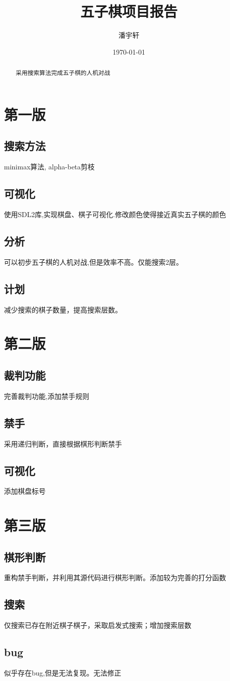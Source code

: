 \documentclass[a4paper,12pt]{ctexart}
\title{五子棋项目报告}
\author{潘宇轩}
\date{\today}
\begin{document}
\maketitle

\begin{abstract}
    采用搜索算法完成五子棋的人机对战
\end{abstract}

\tableofcontents
\section{第一版}

\subsection{搜索方法}

minimax算法, alpha-beta剪枝

\subsection{可视化}
使用SDL2库,实现棋盘、棋子可视化.修改颜色使得接近真实五子棋的颜色

\subsection{分析}
可以初步五子棋的人机对战,但是效率不高。仅能搜索2层。

\subsection{计划}
减少搜索的棋子数量，提高搜索层数。

\section{第二版}

\subsection{裁判功能}
完善裁判功能,添加禁手规则

\subsection{禁手}
采用递归判断，直接根据棋形判断禁手

\subsection{可视化}
添加棋盘标号

\section{第三版}

\subsection{棋形判断}
重构禁手判断，并利用其源代码进行棋形判断。添加较为完善的打分函数

\subsection{搜索}
仅搜索已存在附近棋子棋子，采取启发式搜索；增加搜索层数

\subsection{bug}
似乎存在bug,但是无法复现。无法修正
\end{document}
